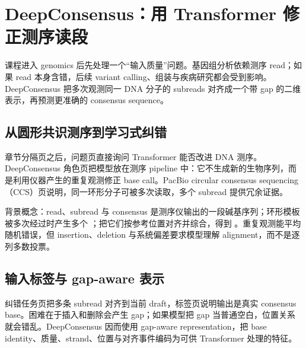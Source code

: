 \section{DeepConsensus：用 Transformer 修正测序读段}

课程进入 genomics 后先处理一个“输入质量”问题。基因组分析依赖测序 read；如果 read 本身含错，后续 variant calling、组装与疾病研究都会受到影响。DeepConsensus 把多次观测同一 DNA 分子的 subreads 对齐成一个带 gap 的二维表示，再预测更准确的 consensus sequence。

\subsection{从圆形共识测序到学习式纠错}

章节分隔页之后，问题页直接询问 Transformer 能否改进 DNA 测序。DeepConsensus 角色页把模型放在测序 pipeline 中：它不生成新的生物序列，而是利用仪器产生的重复观测修正 base call。PacBio circular consensus sequencing（CCS）页说明，同一环形分子可被多次读取，多个 subread 提供冗余证据。





\begin{knowledgebox}{背景概念：read、subread 与 consensus}
 是测序仪输出的一段碱基序列；环形模板被多次经过时产生多个 ；把它们按参考位置对齐并综合，得到 。重复观测能平均随机错误，但 insertion、deletion 与系统偏差要求模型理解 alignment，而不是逐列多数投票。
\end{knowledgebox}

\subsection{输入标签与 gap-aware 表示}

纠错任务页把多条 subread 对齐到当前 draft，标签页说明输出是真实 consensus base。困难在于插入和删除会产生 gap；如果模型把 gap 当普通空白，位置关系就会错乱。DeepConsensus 因而使用 gap-aware representation，把 base identity、质量、strand、位置与对齐事件编码为可供 Transformer 处理的特征。


